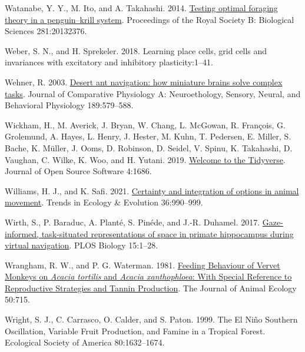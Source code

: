 \documentclass[twoside,12pt,final]{ucthesis-CA2012}
\newenvironment{CSLReferences}%
  {}%
  {\par}
\begin{document}
\begin{ucmainmatter}
\begin{CSLReferences}{1}{0}
\leavevmode{}%
Watanabe, Y. Y., M. Ito, and A. Takahashi. 2014. \href{https://doi.org/10.1098/rspb.2013.2376}{Testing optimal foraging theory in a penguin--krill system}. Proceedings of the Royal Society B: Biological Sciences 281:20132376.

\leavevmode{}%
Weber, S. N., and H. Sprekeler. 2018. Learning place cells, grid cells and invariances with excitatory and inhibitory plasticity:1--41.

\leavevmode{}%
Wehner, R. 2003. \href{https://doi.org/10.1007/s00359-003-0431-1}{Desert ant navigation: how miniature brains solve complex tasks}. Journal of Comparative Physiology A: Neuroethology, Sensory, Neural, and Behavioral Physiology 189:579--588.

\leavevmode{}%
Wickham, H., M. Averick, J. Bryan, W. Chang, L. McGowan, R. François, G. Grolemund, A. Hayes, L. Henry, J. Hester, M. Kuhn, T. Pedersen, E. Miller, S. Bache, K. Müller, J. Ooms, D. Robinson, D. Seidel, V. Spinu, K. Takahashi, D. Vaughan, C. Wilke, K. Woo, and H. Yutani. 2019. \href{https://doi.org/10.21105/joss.01686}{Welcome to the Tidyverse}. Journal of Open Source Software 4:1686.

\leavevmode{}%
Williams, H. J., and K. Safi. 2021. \href{https://doi.org/10.1016/j.tree.2021.06.013}{Certainty and integration of options in animal movement}. Trends in Ecology \& Evolution 36:990--999.

\leavevmode{}%
Wirth, S., P. Baraduc, A. Planté, S. Pinéde, and J.-R. Duhamel. 2017. \href{https://doi.org/10.1371/journal.pbio.2001045}{Gaze-informed, task-situated representations of space in primate hippocampus during virtual navigation}. PLOS Biology 15:1--28.

\leavevmode{}%
Wrangham, R. W., and P. G. Waterman. 1981. \href{https://doi.org/10.2307/4132}{Feeding Behaviour of Vervet Monkeys on \emph{Acacia tortilis} and \emph{Acacia xanthophloea}: With Special Reference to Reproductive Strategies and Tannin Production}. The Journal of Animal Ecology 50:715.

\leavevmode{}%
Wright, S. J., C. Carrasco, O. Calder, and S. Paton. 1999. The El Niño Southern Oscillation, Variable Fruit Production, and Famine in a Tropical Forest. Ecological Society of America 80:1632--1674.


\end{CSLReferences}
\end{ucmainmatter}
\end{document}
